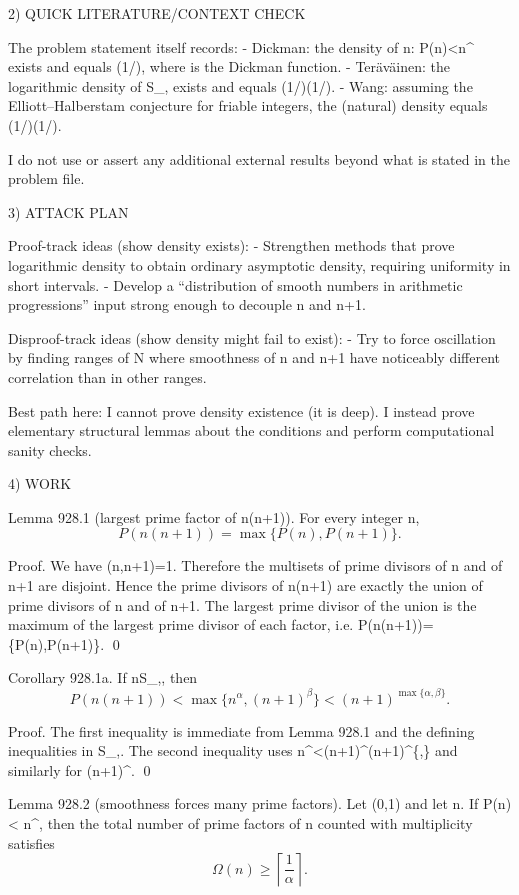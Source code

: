 2) QUICK LITERATURE/CONTEXT CHECK

The problem statement itself records:
- Dickman: the density of {n: P(n)<n^\alpha} exists and equals \rho(1/\alpha), where \rho is the Dickman function.
- Ter\"{a}v\"{a}inen: the logarithmic density of S_{\alpha,\beta} exists and equals \rho(1/\alpha)\rho(1/\beta).
- Wang: assuming the Elliott–Halberstam conjecture for friable integers, the (natural) density equals \rho(1/\alpha)\rho(1/\beta).

I do not use or assert any additional external results beyond what is stated in the problem file.


3) ATTACK PLAN

Proof-track ideas (show density exists):
- Strengthen methods that prove logarithmic density to obtain ordinary asymptotic density, requiring uniformity in short intervals.
- Develop a “distribution of smooth numbers in arithmetic progressions” input strong enough to decouple n and n+1.

Disproof-track ideas (show density might fail to exist):
- Try to force oscillation by finding ranges of N where smoothness of n and n+1 have noticeably different correlation than in other ranges.

Best path here: I cannot prove density existence (it is deep). I instead prove elementary structural lemmas about the conditions and perform computational sanity checks.


4) WORK

Lemma 928.1 (largest prime factor of n(n+1)).
For every integer n,
\[ P(n(n+1)) = \max\{P(n), P(n+1)\}. \]

Proof.
We have \gcd(n,n+1)=1.
Therefore the multisets of prime divisors of n and of n+1 are disjoint.
Hence the prime divisors of n(n+1) are exactly the union of prime divisors of n and of n+1.
The largest prime divisor of the union is the maximum of the largest prime divisor of each factor, i.e.
P(n(n+1))=\max\{P(n),P(n+1)\}. \qed

Corollary 928.1a.
If n\in S_{\alpha,\beta}, then
\[ P(n(n+1)) < \max\{n^{\alpha}, (n+1)^{\beta}\} < (n+1)^{\max\{\alpha,\beta\}}. \]

Proof.
The first inequality is immediate from Lemma 928.1 and the defining inequalities in S_{\alpha,\beta}.
The second inequality uses n^{\alpha}<(n+1)^{\alpha}\le (n+1)^{\max\{\alpha,\beta\}} and similarly for (n+1)^{\beta}. \qed

Lemma 928.2 (smoothness forces many prime factors).
Let \alpha\in(0,1) and let n.
If P(n) < n^{\alpha}, then the total number of prime factors of n counted with multiplicity satisfies
\[ \Omega(n) \ge \left\lceil \frac{1}{\alpha} \right\rceil. \]

